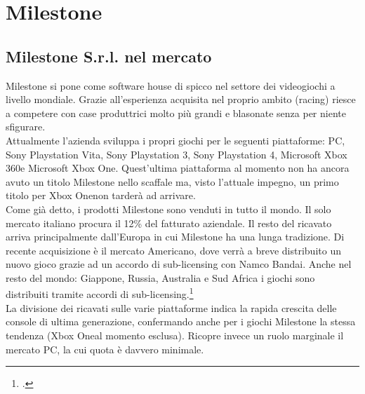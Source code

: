 
\chapter{Milestone}
\label{cap:milestone}

\section{Milestone S.r.l. nel mercato}

Milestone si pone come software house di spicco nel settore dei videogiochi a livello mondiale. Grazie all'esperienza acquisita nel proprio ambito (racing) riesce a competere con case produttrici molto più grandi e blasonate senza per niente sfigurare.\\

Attualmente l'azienda sviluppa i propri giochi per le seguenti piattaforme: PC, Sony Playstation Vita\textregistered, Sony Playstation 3\textregistered, Sony Playstation 4\textregistered, Microsoft Xbox 360\textregistered e Microsoft Xbox One\textregistered. Quest'ultima piattaforma al momento non ha ancora avuto un titolo Milestone nello scaffale ma, visto l'attuale impegno, un primo titolo per Xbox One\textregistered non tarderà ad arrivare.\\

Come già detto, i prodotti Milestone sono venduti in tutto il mondo. Il solo mercato italiano procura il 12\% del fatturato aziendale. Il resto del ricavato arriva principalmente dall'Europa in cui Milestone ha una lunga tradizione. Di recente acquisizione è il mercato Americano, dove verrà a breve distribuito un nuovo gioco grazie ad un accordo di sub-licensing con Namco Bandai. Anche nel resto del mondo: Giappone, Russia, Australia e Sud Africa i giochi sono distribuiti tramite accordi di sub-licensing.\footcite{site:accordo-namco-bandai}\\

La divisione dei ricavati sulle varie piattaforme indica la rapida crescita delle console di ultima generazione, confermando anche per i giochi Milestone la stessa tendenza (Xbox One\textregistered al momento esclusa). Ricopre invece un ruolo marginale il mercato PC, la cui quota è davvero minimale.\\

